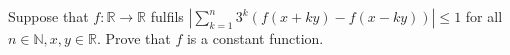 Suppose that \(f\colon  \mathbb{R}\to\mathbb{R}\) fulfils \(\left|\sum^n_{k=1}3^k\left(f(x+ky)-f(x-ky)\right)\right|\le1\) for all \(n\in\mathbb{N},x,y\in\mathbb{R}\). Prove that \(f\) is a constant function.